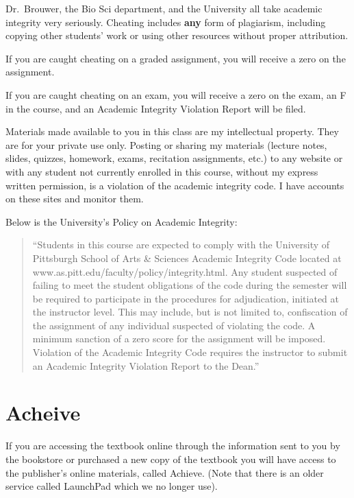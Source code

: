 \documentclass[
]{book}
\begin{document}
Dr.~Brouwer, the Bio Sci department, and the University all take academic integrity very seriously. Cheating includes \textbf{any} form of plagiarism, including copying other students' work or using other resources without proper attribution.

If you are caught cheating on a graded assignment, you will receive a zero on the assignment.

If you are caught cheating on an exam, you will receive a zero on the exam, an F in the course, and an Academic Integrity Violation Report will be filed.

Materials made available to you in this class are my intellectual property. They are for your private use only. Posting or sharing my materials (lecture notes, slides, quizzes, homework, exams, recitation assignments, etc.) to any website or with any student not currently enrolled in this course, without my express written permission, is a violation of the academic integrity code. I have accounts on these sites and monitor them.

Below is the University's Policy on Academic Integrity:

\begin{quote}
``Students in this course are expected to comply with the University of Pittsburgh School of Arts \& Sciences Academic Integrity Code located at www.as.pitt.edu/faculty/policy/integrity.html. Any student suspected of failing to meet the student obligations of the code during the semester will be required to participate in the procedures for adjudication, initiated at the instructor level. This may include, but is not limited to, confiscation of the assignment of any individual suspected of violating the code. A minimum sanction of a zero score for the assignment will be imposed. Violation of the Academic Integrity Code requires the instructor to submit an Academic Integrity Violation Report to the Dean.''
\end{quote}

\hypertarget{acheive}{%
\chapter{Acheive}\label{acheive}}

If you are accessing the textbook online through the information sent to you by the bookstore or purchased a new copy of the textbook you will have access to the publisher's online materials, called Achieve. (Note that there is an older service called LaunchPad which we no longer use).
\end{document}
